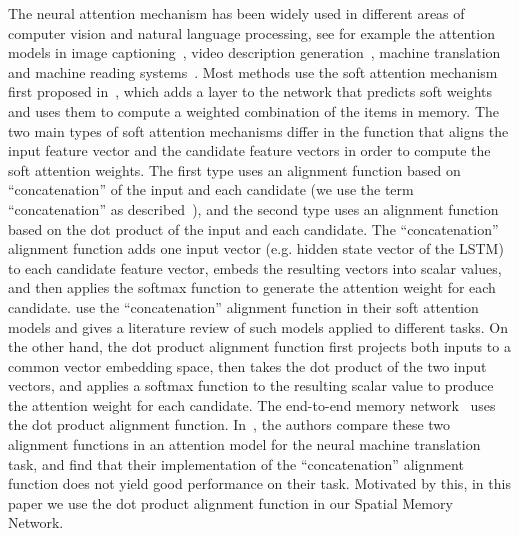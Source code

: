 The neural attention mechanism has been widely used in different areas of computer vision and natural language processing, see  for example the attention models in image captioning~\cite{xu2015show}, video description generation~\cite{yao2015describing}, machine translation~\cite{bahdanau2014neural}\cite{luong2015effective} and machine reading systems~\cite{hermann2015teaching}. 
Most methods use the soft attention mechanism first proposed in~\cite{bahdanau2014neural}, which adds a layer to the network that predicts soft weights and uses them to compute a weighted combination of the items in memory. 
The two main types of soft attention mechanisms differ in the  function that aligns the input feature vector and the candidate feature vectors in order to compute the soft attention weights. 
The first type uses an alignment function based on ``concatenation'' of the input and each candidate (we use the term ``concatenation'' as described~\cite{luong2015effective}), and the second type uses an alignment function based on the dot product of the input and each candidate. 
The ``concatenation'' alignment function adds one input vector (e.g. hidden state vector of the LSTM) to each candidate feature vector, embeds the resulting vectors into scalar values, and then applies the softmax function to generate the attention weight for each candidate. 
\cite{xu2015show}\cite{yao2015describing}\cite{bahdanau2014neural}\cite{hermann2015teaching} use the ``concatenation'' alignment function in their soft attention models and \cite{cho2015describing} gives a literature review of such models applied to different tasks. 
On the other hand, the dot product alignment function first projects both inputs to a common vector embedding space, then takes the dot product of the two input vectors, and applies a softmax function to the resulting scalar value to produce the attention weight for each candidate. 
The end-to-end memory network~\cite{sukhbaatar2015end} uses the dot product alignment function. 
In~\cite{luong2015effective}, the authors compare these two alignment functions in an attention model for the neural machine translation task, and find that their implementation of the ``concatenation'' alignment function does not yield good performance on their task. 
Motivated by this, in this paper we use the dot product alignment function in our Spatial Memory Network. 


